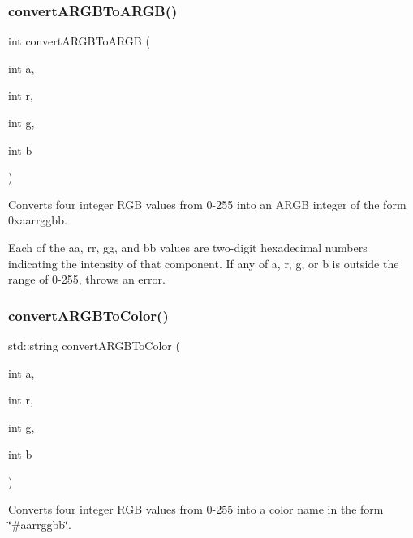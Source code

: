 \subsubsection{\texorpdfstring{convert\+A\+R\+G\+B\+To\+A\+R\+G\+B()}{convertARGBToARGB()}}
{\footnotesize\ttfamily int convert\+A\+R\+G\+B\+To\+A\+R\+GB (\begin{DoxyParamCaption}\item[{int}]{a,  }\item[{int}]{r,  }\item[{int}]{g,  }\item[{int}]{b }\end{DoxyParamCaption})\hspace{0.3cm}{\ttfamily [static]}}



Converts four integer R\+GB values from 0-\/255 into an A\+R\+GB integer of the form {\ttfamily 0xaarrggbb}. 

Each of the {\ttfamily aa}, {\ttfamily rr}, {\ttfamily gg}, and {\ttfamily bb} values are two-\/digit hexadecimal numbers indicating the intensity of that component. If any of a, r, g, or b is outside the range of 0-\/255, throws an error. \mbox{\label{classsgl_1_1GColor_abc3a0188f264217b768e4a9a63fbc54e}} 
\subsubsection{\texorpdfstring{convert\+A\+R\+G\+B\+To\+Color()}{convertARGBToColor()}\hspace{0.1cm}{\footnotesize\ttfamily [1/2]}}
{\footnotesize\ttfamily std\+::string convert\+A\+R\+G\+B\+To\+Color (\begin{DoxyParamCaption}\item[{int}]{a,  }\item[{int}]{r,  }\item[{int}]{g,  }\item[{int}]{b }\end{DoxyParamCaption})\hspace{0.3cm}{\ttfamily [static]}}



Converts four integer R\+GB values from 0-\/255 into a color name in the form {\ttfamily \char`\"{}\#aarrggbb\char`\"{}}. 

